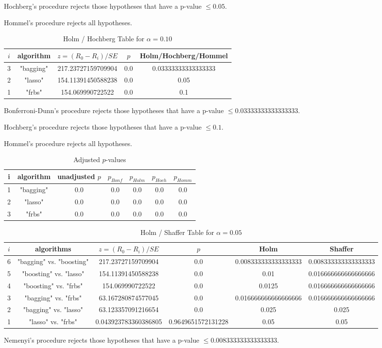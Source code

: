 \documentclass[a4paper,10pt]{article}
\begin{document}
\begin{landscape}
Hochberg's procedure rejects those hypotheses that have a p-value $\le0.05$.


Hommel's procedure rejects all hypotheses.


\begin{table}[!htp]
\centering\tiny
\caption{Holm / Hochberg Table for $\alpha=0.10$}
\begin{tabular}{ccccc}
$i$&algorithm&$z=(R_0 - R_i)/SE$&$p$&Holm/Hochberg/Hommel\\
\hline
3&"bagging"&217.23727159709904&0.0&0.03333333333333333\\
2&"lasso"&154.11391450588238&0.0&0.05\\
1&"frbs"&154.069990722522&0.0&0.1\\
\hline
\end{tabular}
\end{table}
Bonferroni-Dunn's procedure rejects those hypotheses that have a p-value $\le0.03333333333333333$.


Hochberg's procedure rejects those hypotheses that have a p-value $\le0.1$.


Hommel's procedure rejects all hypotheses.


\begin{table}[!htp]
\centering\tiny
\caption{Adjusted $p$-values}
\begin{tabular}{ccccccc}
i&algorithm&unadjusted $p$&$p_{Bonf}$&$p_{Holm}$&$p_{Hoch}$&$p_{Homm}$\\
\hline
1&"bagging"&0.0&0.0&0.0&0.0&0.0\\
2&"lasso"&0.0&0.0&0.0&0.0&0.0\\
3&"frbs"&0.0&0.0&0.0&0.0&0.0\\
\hline
\end{tabular}
\end{table}

\begin{table}[!htp]
\centering\tiny
\caption{Holm / Shaffer Table for $\alpha=0.05$}
\begin{tabular}{cccccc}
$i$&algorithms&$z=(R_0 - R_i)/SE$&$p$&Holm&Shaffer\\
\hline
6&"bagging" vs. "boosting"&217.23727159709904&0.0&0.008333333333333333&0.008333333333333333\\
5&"boosting" vs. "lasso"&154.11391450588238&0.0&0.01&0.016666666666666666\\
4&"boosting" vs. "frbs"&154.069990722522&0.0&0.0125&0.016666666666666666\\
3&"bagging" vs. "frbs"&63.167280874577045&0.0&0.016666666666666666&0.016666666666666666\\
2&"bagging" vs. "lasso"&63.123357091216654&0.0&0.025&0.025\\
1&"lasso" vs. "frbs"&0.043923783360386805&0.9649651572131228&0.05&0.05\\
\hline
\end{tabular}
\end{table}
Nemenyi's procedure rejects those hypotheses that have a p-value $\le0.008333333333333333$.



\end{landscape}
\end{document}
